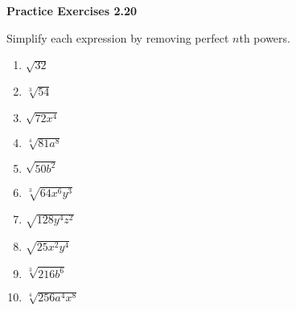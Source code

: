 \vspace{1ex}
\noindent\textbf{Practice Exercises 2.20}

\vspace{0.75ex}

Simplify each expression by removing perfect \(n\)th powers.

\begin{multicols}{2}
\begin{enumerate}[noitemsep, label = \color{blue}\arabic*. ]
    \item $\sqrt{32}$
    \item $\sqrt[{\scriptstyle 3}]{54}$
    \item $\sqrt{72x^4}$
    \item $\sqrt[{\scriptstyle 4}]{81a^8}$
    \item $\sqrt{50b^2}$
    \item $\sqrt[{\scriptstyle 3}]{64x^6y^3}$
    \item $\sqrt{128y^4z^2}$
    \item $\sqrt{25x^2y^4}$
    \item $\sqrt[{\scriptstyle 3}]{216b^6}$
    \item $\sqrt[{\scriptstyle 4}]{256a^4x^8}$
\end{enumerate}
\end{multicols}

